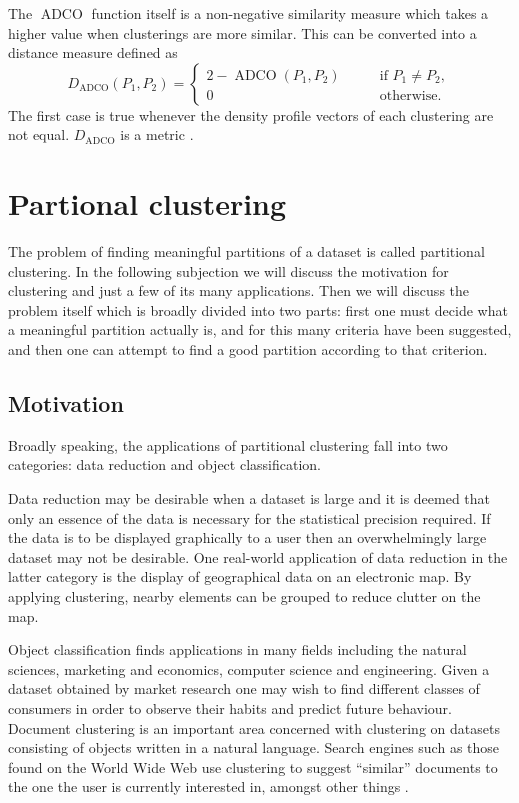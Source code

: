 \documentclass[a4paper]{report}
\DeclareMathOperator{\ADCO}{ADCO}
\begin{document}
The $\ADCO$ function itself is a non-negative similarity measure which takes a
higher value when clusterings are more similar.  This can be converted into a
distance measure defined as
\begin{equation*}
  D_{\ADCO}(P_1,P_2) =
  \begin{cases}
    2 - \ADCO(P_1,P_2) & \qquad \text{if $P_1 \neq P_2$},\\
    0 & \qquad \text{otherwise}.
  \end{cases}
\end{equation*}
The first case is true whenever the density profile vectors of each clustering
are not equal.  $D_{\ADCO}$ is a metric \citep{bae-2010}.

\section{Partional clustering}
\label{sec:part-clust-algor}

The problem of finding meaningful partitions of a dataset is called
partitional clustering.  In the following subjection we will discuss the
motivation for clustering and just a few of its many applications.  Then we
will discuss the problem itself which is broadly divided into two parts: first
one must decide what a meaningful partition actually is, and for this many
criteria have been suggested, and then one can attempt to find a good
partition according to that criterion.

\subsection{Motivation}
\label{sec:part-clus-motivation}

Broadly speaking, the applications of partitional clustering fall into two
categories: data reduction and object classification.

Data reduction may be desirable when a dataset is large and it is deemed that
only an essence of the data is necessary for the statistical precision
required.  If the data is to be displayed graphically to a user then an
overwhelmingly large dataset may not be desirable.  One real-world application
of data reduction in the latter category is the display of geographical data
on an electronic map.  By applying clustering, nearby elements can be grouped
to reduce clutter on the map.

Object classification finds applications in many fields including the natural
sciences, marketing and economics, computer science and engineering.  Given a
dataset obtained by market research one may wish to find different classes of
consumers in order to observe their habits and predict future behaviour.
Document clustering is an important area concerned with clustering on datasets
consisting of objects written in a natural language.  Search engines such as
those found on the World Wide Web use clustering to suggest ``similar''
documents to the one the user is currently interested in, amongst other things
\citep[see][]{steinbach2000comparison}.
\end{document}
